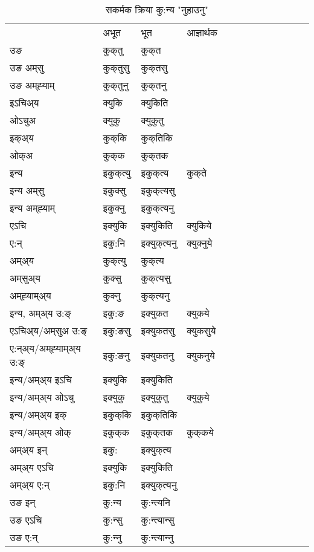 \begin{table}[H]
\centering
\caption{\label{ukt.vt} सकर्मक क्रिया  कु:न्य  "नुहाउनु"  }
\begin{tabular}{l|l|l|l|l|l|l|l|l|l|l|l|l}  \toprule
&अभूत & भूत & आज्ञार्थक \\ 
उङ &कुक्‌तु &कुक्‌त \\ 
उङ अम्‌सु&कुक्‌तुसु &कुक्‌तसु \\ 
उङ अम्‌ह्‍याम्&कुक्‌तुनु &कुक्‌तनु \\ 
इऽचिअ्य &क्युकि &क्युकिति   \\ 
ओऽचुअ        &क्युकु &क्युकुतु   \\ 
इक्अ्य&कुक्‌कि &कुक्‌तिकि   \\ 
ओक्अ &कुक्‌क &कुक्‌तक   \\ 
इन्य & इकुक्‌त्यु  & इकुक्‌त्य &कुक्‌ते  \\ 
इन्य अम्‌सु& इकुक्सु  & इकुक्‌त्यसु   \\ 
इन्य अम्‌ह्‍याम्& इकुक्‍नु  & इकुक्‌त्यनु   \\ 
एऽचि & इक्युकि & इक्युकिति &क्युकिये    \\ 
ए:न् & इकु:नि  & इक्युक्‌त्यनु &क्युक्‍नुये  \\ 
अम्अ्य & कुक्‌त्यु  & कुक्‌त्य  \\ 
अम्‌सुअ्य & कुक्सु & कुक्‌त्यसु  \\ 
अम्‌ह्‍याम्अ्य & कुक्‍नु  & कुक्‌त्यनु \\ 
\midrule
इन्य, अम्अ्य उ:ङ्‌ &इकु:ङ &इक्युकत &क्युकये \\ 
एऽचिअ्य/अम्‌सुअ उ:ङ्‌ &इकु:ङसु &इक्युकतसु &क्युकसुये \\ 
ए:न्अ्य/अम्‌ह्‍याम्अ्य उ:ङ्‌ &इकु:ङनु &इक्युकतनु &क्युकनुये \\ 
इन्य/अम्अ्य इऽचि &इक्युकि &इक्युकिति    \\ 
इन्य/अम्अ्य ओऽचु &इक्युकु &इक्युकुतु  &क्युकुये  \\ 
इन्य/अम्अ्य इक् &इकुक्‌कि &इकुक्‌तिकि   \\ 
इन्य/अम्अ्य ओक् &इकुक्‌क &इकुक्‌तक  &कुक्‌कये  \\ 
अम्अ्य इन् & इकु: & इक्युक्‌त्य   \\ 
अम्अ्य एऽचि & इक्युकि & इक्युकिति    \\ 
अम्अ्य ए:न् & इकु:नि  & इक्युक्‌त्यनु  \\ 
\midrule
उङ इन् & कु:न्य  & कु:न्त्यनि  \\ 
उङ एऽचि & कु:न्सु  & कु:न्त्यान्सु   \\ 
उङ ए:न्& कु:न्‍नु  & कु:न्त्यान्‍नु   \\ 
\bottomrule
\end{tabular}
\end{table}


